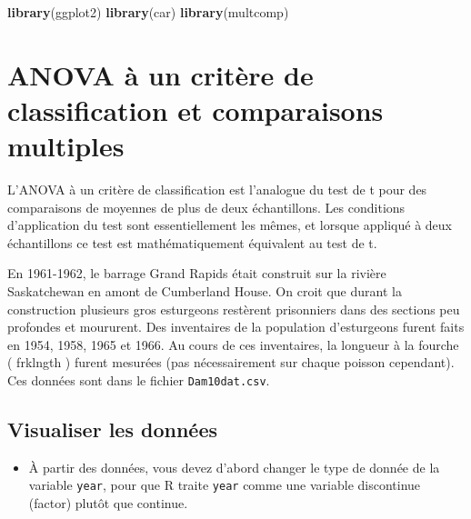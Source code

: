 \documentclass[12pt,]{book}
\newenvironment{Shaded}{\begin{snugshade}}{\end{snugshade}}
\newcommand{\KeywordTok}[1]{\textcolor[rgb]{0.27,0.27,0.27}{\textbf{#1}}}
\newcommand{\NormalTok}[1]{#1}
\newcommand{\OperatorTok}[1]{\textcolor[rgb]{0.43,0.43,0.43}{\textbf{#1}}}
\newcommand{\StringTok}[1]{\textcolor[rgb]{0.5,0.5,0.5}{#1}}
\providecommand{\tightlist}{%
  \setlength{\itemsep}{0pt}\setlength{\parskip}{0pt}}
\begin{document}
\begin{Shaded}
\begin{Highlighting}[]
\KeywordTok{library}\NormalTok{(ggplot2)}
\KeywordTok{library}\NormalTok{(car)}
\KeywordTok{library}\NormalTok{(multcomp)}
\end{Highlighting}
\end{Shaded}

\hypertarget{anova-uxe0-un-crituxe8re-de-classification-et-comparaisons-multiples}{%
\section{ANOVA à un critère de classification et comparaisons multiples}\label{anova-uxe0-un-crituxe8re-de-classification-et-comparaisons-multiples}}

L'ANOVA à un critère de classification est l'analogue du test de t pour des comparaisons de moyennes de plus de deux échantillons. Les conditions d'application du test sont essentiellement les mêmes, et lorsque appliqué à deux échantillons ce test est mathématiquement équivalent au test de t.

En 1961-1962, le barrage Grand Rapids était construit sur la rivière Saskatchewan en amont de Cumberland House. On croit que durant la construction plusieurs gros esturgeons restèrent prisonniers dans des sections peu profondes et moururent. Des inventaires de la population d'esturgeons furent faits en 1954, 1958, 1965 et 1966. Au cours de ces inventaires, la longueur à la fourche ( frklngth ) furent mesurées (pas nécessairement sur chaque poisson cependant). Ces données sont dans le fichier \texttt{Dam10dat.csv}.

\hypertarget{visualiser-les-donnuxe9es}{%
\subsection{Visualiser les données}\label{visualiser-les-donnuxe9es}}

\begin{itemize}
\tightlist
\item
  À partir des données, vous devez d'abord changer le type de donnée de la variable \texttt{year}, pour que R traite \texttt{year} comme une variable discontinue (factor) plutôt que continue.
\end{itemize}

\begin{Shaded}
\end{Shaded}
\end{document}
